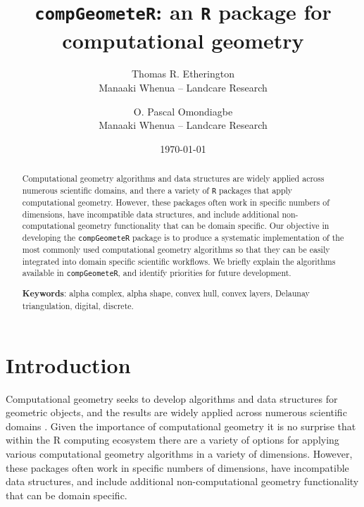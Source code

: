 \documentclass[12pt, a4paper]{article}
\begin{document}
\title{\texttt{compGeometeR}: an \texttt{R} package for computational geometry}

\author{Thomas R. Etherington  \\
	Manaaki Whenua -- Landcare Research  \\
	\and 
	O. Pascal Omondiagbe \\
	Manaaki Whenua -- Landcare Research \\
	}



\date{\today}



\maketitle


\begin{abstract}

Computational geometry algorithms and data structures are widely applied across numerous scientific domains, and there a variety of \texttt{R} packages that apply computational geometry.  However, these packages often work in specific numbers of dimensions, have incompatible data structures, and include additional non-computational geometry functionality that can be domain specific.  Our objective in developing the \texttt{compGeometeR} package is to produce a systematic implementation of the most commonly used computational geometry algorithms so that they can be easily integrated into domain specific scientific workflows.  We briefly explain the algorithms available in \texttt{compGeometeR}, and identify priorities for future development.

\begin{center}
\textbf{Keywords}: alpha complex, alpha shape, convex hull, convex layers, Delaunay triangulation, digital, discrete.
\end{center}

\end{abstract}

\section{Introduction}

Computational geometry seeks to develop algorithms and data structures for geometric objects, and the results are widely applied across numerous scientific domains \citep{de-berg-2008}.  Given the importance of computational geometry it is no surprise that within the R computing ecosystem there are a variety of options for applying various computational geometry algorithms in a variety of dimensions.  However, these packages often work in specific numbers of dimensions, have incompatible data structures, and include additional non-computational geometry functionality that can be domain specific.
\end{document}
